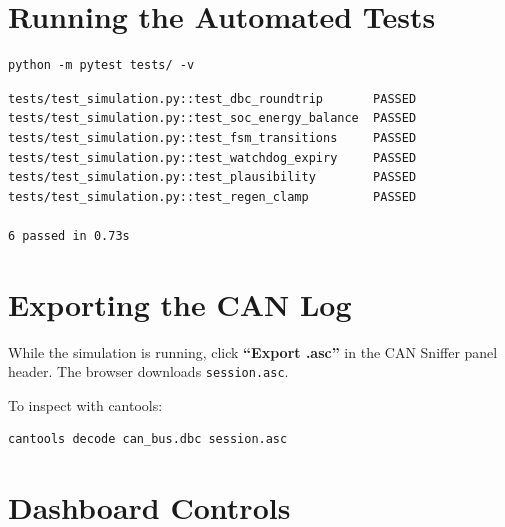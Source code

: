\documentclass[12pt, a4paper, openany]{report}
\newcommand{\code}[1]{\texttt{#1}}
\begin{document}
\begin{center}
\section{Running the Automated Tests}

\begin{lstlisting}[style=bash]
python -m pytest tests/ -v
\end{lstlisting}

\begin{lstlisting}[style=shell]
tests/test_simulation.py::test_dbc_roundtrip       PASSED
tests/test_simulation.py::test_soc_energy_balance  PASSED
tests/test_simulation.py::test_fsm_transitions     PASSED
tests/test_simulation.py::test_watchdog_expiry     PASSED
tests/test_simulation.py::test_plausibility        PASSED
tests/test_simulation.py::test_regen_clamp         PASSED

6 passed in 0.73s
\end{lstlisting}

\section{Exporting the CAN Log}

While the simulation is running, click \textbf{``Export .asc''} in the CAN
Sniffer panel header. The browser downloads \code{session.asc}.

To inspect with cantools:
\begin{lstlisting}[style=bash]
cantools decode can_bus.dbc session.asc
\end{lstlisting}

\section{Dashboard Controls}


\end{center}
\end{document}
